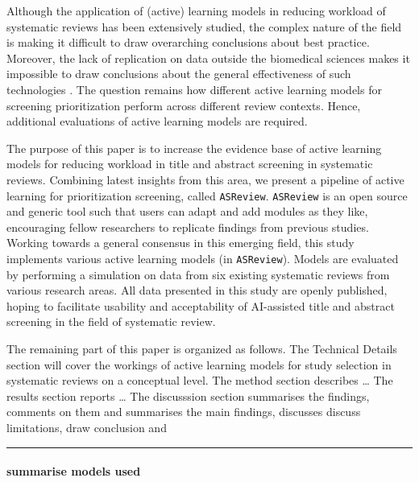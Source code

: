 \documentclass[
]{article}
\begin{document}
Although the application of (active) learning models in reducing
workload of systematic reviews has been extensively studied, the complex
nature of the field is making it difficult to draw overarching
conclusions about best practice. Moreover, the lack of replication on
data outside the biomedical sciences makes it impossible to draw
conclusions about the general effectiveness of such technologies
\autocite{OMara-Eves2015}. The question remains how different active
learning models for screening prioritization perform across different
review contexts. Hence, additional evaluations of active learning models
are required.

The purpose of this paper is to increase the evidence base of active
learning models for reducing workload in title and abstract screening in
systematic reviews. Combining latest insights from this area, we present
a pipeline of active learning for prioritization screening, called
\texttt{ASReview}. \texttt{ASReview} is an open source and generic tool
such that users can adapt and add modules as they like, encouraging
fellow researchers to replicate findings from previous studies. Working
towards a general consensus in this emerging field, this study
implements various active learning models (in \texttt{ASReview}). Models
are evaluated by performing a simulation on data from six existing
systematic reviews from various research areas. All data presented in
this study are openly published, hoping to facilitate usability and
acceptability of AI-assisted title and abstract screening in the field
of systematic review.

The remaining part of this paper is organized as follows. The Technical
Details section will cover the workings of active learning models for
study selection in systematic reviews on a conceptual level. The method
section describes \ldots{} The results section reports \ldots{} The
discusssion section summarises the findings, comments on them and
summarises the main findings, discusses discuss limitations, draw
conclusion and

\autocite{Marshall2020}

\begin{center}\rule{0.5\linewidth}{0.5pt}\end{center}

\hypertarget{summarise-models-used}{%
\paragraph{summarise models used}\label{summarise-models-used}}
\end{document}
